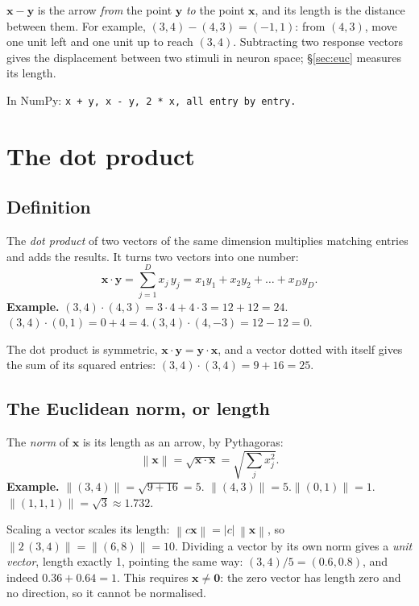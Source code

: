 \documentclass[11pt]{article}
\newcommand{\vx}{\bm{x}}
\newcommand{\vy}{\bm{y}}
\newcommand{\norm}[1]{\left\lVert #1 \right\rVert}
\newcommand{\np}[1]{{\small\color{lightgray}In NumPy: \texttt{#1}}\par}
\begin{document}
\begin{keybox}
 $\vx - \vy$ is the arrow \emph{from} the point $\vy$ \emph{to}
the point $\vx$, and its length is the distance between them. For example,
$(3, 4) - (4, 3) = (-1, 1)$: from $(4, 3)$, move one unit left and one unit up to reach
$(3, 4)$. Subtracting two response vectors gives the displacement between two stimuli in
neuron space; \S\ref{sec:euc} measures its length.
\end{keybox}

\np{x + y, x - y, 2 * x, all entry by entry.}

\section{The dot product}

\subsection{Definition}

The \emph{dot product} of two vectors of the same dimension multiplies matching entries
and adds the results. It turns two vectors into one number:
\[
\vx \cdot \vy = \sum_{j=1}^{D} x_j\,y_j = x_1 y_1 + x_2 y_2 + \dots + x_D y_D .
\]
\textbf{Example.} $(3, 4)\cdot(4, 3) = 3\cdot4 + 4\cdot3 = 12 + 12 = 24$.\quad
$(3, 4)\cdot(0, 1) = 0 + 4 = 4$.\quad $(3, 4)\cdot(4, -3) = 12 - 12 = 0$.

The dot product is symmetric, $\vx \cdot \vy = \vy \cdot \vx$, and a vector dotted with
itself gives the sum of its squared entries: $(3, 4)\cdot(3, 4) = 9 + 16 = 25$.

\subsection{The Euclidean norm, or length}

The \emph{norm} of $\vx$ is its length as an arrow, by Pythagoras:
\[
\norm{\vx} = \sqrt{\vx \cdot \vx} = \sqrt{\textstyle\sum_j x_j^2} .
\]
\textbf{Example.} $\norm{(3, 4)} = \sqrt{9 + 16} = 5$.\quad
$\norm{(4, 3)} = 5$.\quad $\norm{(0, 1)} = 1$.\quad $\norm{(1, 1, 1)} = \sqrt{3} \approx 1.732$.

Scaling a vector scales its length: $\norm{c\vx} = |c|\,\norm{\vx}$, so
$\norm{2\,(3, 4)} = \norm{(6, 8)} = 10$. Dividing a vector by its own norm gives a
\emph{unit vector}, length exactly 1, pointing the same way: $(3, 4)/5 = (0.6, 0.8)$,
and indeed $0.36 + 0.64 = 1$. This requires $\vx \neq \bm{0}$: the zero vector has length
zero and no direction, so it cannot be normalised.
\end{document}
